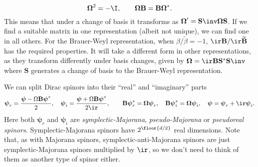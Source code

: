 \documentclass[11pt]{article}
\renewcommand{\S}{\mathbf{S}}
\newcommand{\B}{\mathbf{B}}
\newcommand{\Bt}{\widetilde{\mathbf{B}}}
\newcommand{\psib}{\boldsymbol{\psi}}
\newcommand{\Omegab}{\boldsymbol{\Omega}}
\newcommand{\betat}{\tilde{\beta}}
\begin{document}
%
\begin{equation}\label{eq:symplectic}
  \Omegab^2 = - \I,
  \qquad
  \Omegab \B = \B \Omegab^\ast.
\end{equation}
%
This means that under a change of basis it transforms as $\Omegab' = \S\inv \Omegab \S$.
If we find a suitable matrix in one representation (albeit not unique), we can find one in all others.
For the Brauer-Weyl representation, when $\beta/\betat = -1$, $\ir\B/\ir\Bt$ has the required properties.
It will take a different form in other representations, as they transform differently under basis changes, given by $\Omegab = \ir \B \S^\ast \S\inv$ where $\S$  generates a change of basis to the Brauer-Weyl representation.

We can split Dirac spinors into their ``real'' and ``imaginary'' parts
%
\begin{equation}\label{eq:psedoreim}
  \psib_r = \frac{\psib - \Omega \B \psib^\ast}{2},
  \quad
  \psib_i = \frac{\psib + \Omega \B \psib^\ast}{2\ir},
  \qquad
  \B \psib_r^\ast = \Omegab \psib_r,
  \quad
  \B \psib_i^\ast = \Omegab \psib_i,
  \quad
  \psib = \psib_r + \ir \psib_i.
\end{equation}
%
Here both $\psib_r$ and $\psib_i$ are \emph{symplectic-Majorana}, \emph{pseudo-Majorana} or \emph{pseudoreal spinors}.
Symplectic-Majorana spinors have $2^{\floor{d/2}}$ real dimensions.
Note that, as with Majorana spinors, symplectic-anti-Majorana spinors are just symplectic-Majorana spinors multiplied by $\ir$, so we don't need to think of them as another type of spinor either.
\end{document}
